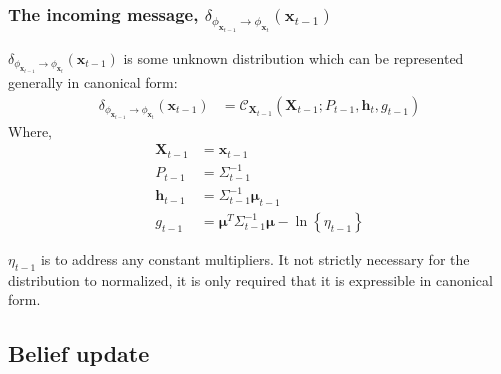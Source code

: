 \subsubsection{The incoming message, $\delta_{\phi_{\pmb{x}_{t-1}} \rightarrow \phi_{\pmb{x}_{t}}} (\pmb{x}_{t-1})$}
\label{subsubsection:rec_bel}

$\delta_{\phi_{\pmb{x}_{t-1}} \rightarrow \phi_{\pmb{x}_{t}}} (\pmb{x}_{t-1})$ is some unknown distribution which can be represented generally in canonical form:
\begin{align}
\delta_{\phi_{\pmb{x}_{t-1}} \rightarrow \phi_{\pmb{x}_{t}}} (\pmb{x}_{t-1}) &= \mathcal{C}_{\pmb{X}_{t-1}} \left( \pmb{X}_{t-1}; P_{t-1}, \pmb{h}_{t}, g_{t-1} \right) 
\end{align}
Where, 
\begin{align}
\pmb{X}_{t-1} &= \pmb{x}_{t-1} \\
P_{t-1} &= \Sigma^{-1}_{t-1} \\
\mathbf{h}_{t-1} &= \Sigma_{t-1}^{-1} \pmb{\mu}_{t-1} \\
g_{t-1} &= \pmb{\mu}^{T} \Sigma_{t-1}^{-1} \pmb{\mu} - \ln{ \left\{ \eta_{t-1} \right\} }
\end{align}

$\eta_{t-1}$ is to address any constant multipliers. It not strictly necessary for the distribution to normalized, it is only required that it is expressible in canonical form.
 
\subsection{Belief update}
\label{section:belief_update}

